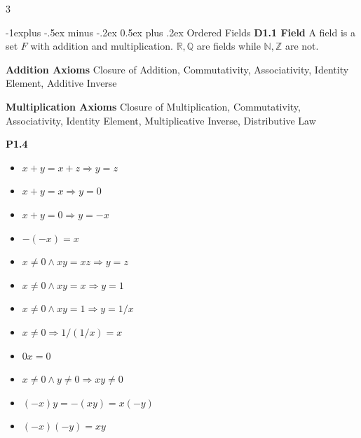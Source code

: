 \documentclass[10pt, landscape]{article}
\makeatletter
\renewcommand{\section}{\@startsection{section}{1}{0mm}%
                                {-1ex plus -.5ex minus -.2ex}%
                                {0.5ex plus .2ex}%
                                {\normalfont\large\bfseries}}
\renewcommand{\section}{\@startsection{section}{2}{0mm}%
                                {-1explus -.5ex minus -.2ex}%
                                {0.5ex plus .2ex}%
                                {\normalfont\normalsize\bfseries}}
\makeatother
\begin{document}
\raggedright
\footnotesize
\begin{multicols*}{3}

\setlength{\columnseprule}{0.25pt}
\setlength{\premulticols}{1pt}
\setlength{\postmulticols}{1pt}
\setlength{\multicolsep}{1pt}
\setlength{\columnsep}{2pt}

\begin{center}
\end{center}

\section{Ordered Fields}
\textbf{D1.1 Field} A field is a set $F$ with addition and multiplication. $\mathbb{R}, \mathbb{Q}$ are fields while $\mathbb{N}, \mathbb{Z}$ are not.

\textbf{Addition Axioms} Closure of Addition, Commutativity, Associativity, Identity Element, Additive Inverse

\textbf{Multiplication Axioms} Closure of Multiplication, Commutativity, Associativity, Identity Element, Multiplicative Inverse, Distributive Law

\textbf{P1.4}
\begin{itemize}
    \item $x+y=x+z \Rightarrow y = z$
    \item $x+y=x \Rightarrow y = 0$
    \item $x+y = 0 \Rightarrow y = -x$
    \item $-(-x)=x$
    \item $x \neq 0 \land xy = xz \Rightarrow y  = z$
    \item $x \neq 0 \land xy = x \Rightarrow y = 1$
    \item $x \neq 0 \land xy = 1 \Rightarrow y = 1/x$
    \item $x \neq 0 \Rightarrow1/(1/x) = x$
    \item $0x = 0$
    \item $x \neq 0 \land y \neq 0 \Rightarrow xy \neq 0$
    \item $(-x)y=-(xy)=x(-y)$
    \item $(-x)(-y)=xy$
\end{itemize}


\end{multicols*}
\end{document}
